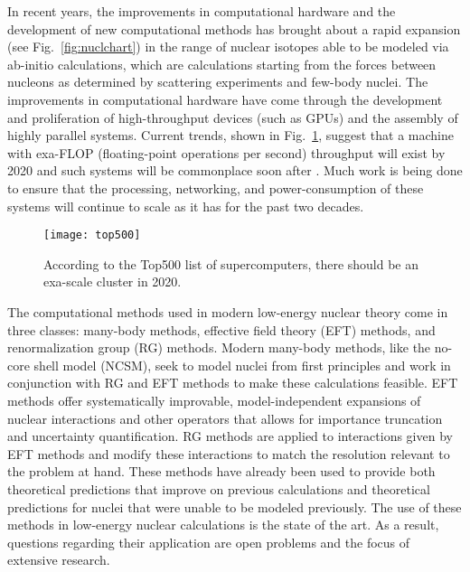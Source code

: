 In recent years, the improvements in computational hardware and the development of new computational methods has brought about a rapid expansion (see Fig.~\ref{fig:nuclchart}) in the range of nuclear isotopes able to be modeled via ab-initio calculations, which are calculations starting from the forces between nucleons as determined by scattering experiments and few-body nuclei. The improvements in computational hardware have come through the development and proliferation of high-throughput devices (such as GPUs) and the assembly of highly parallel systems. Current trends, shown in Fig.~\ref{fig:top500}, suggest that a machine with exa-FLOP (floating-point operations per second) throughput will exist by 2020 and such systems will be commonplace soon after \cite{Top500}. Much work is being done to ensure that the processing, networking, and power-consumption of these systems will continue to scale as it has for the past two decades.

\begin{figure}[t]
    \begin{center}
        \texttt{[image: top500]}
    \end{center}
    \caption{According to the Top500 list of supercomputers, there should be an exa-scale cluster in 2020.}
    \label{fig:top500}
\end{figure}

The computational methods used in modern low-energy nuclear theory come in three classes: many-body methods, effective field theory (EFT) methods, and renormalization group (RG) methods. Modern many-body methods, like the no-core shell model (NCSM), seek to model nuclei from first principles and work in conjunction with RG and EFT methods to make these calculations feasible. EFT methods offer systematically improvable, model-independent expansions of nuclear interactions and other operators that allows for importance truncation and uncertainty quantification. RG methods are applied to interactions given by EFT methods and modify these interactions to match the resolution relevant to the problem at hand. These methods have already been used to provide both theoretical predictions that improve on previous calculations and theoretical predictions for nuclei that were unable to be modeled previously. The use of these methods in low-energy nuclear calculations is the state of the art. As a result, questions regarding their application are open problems and the focus of extensive research. %

